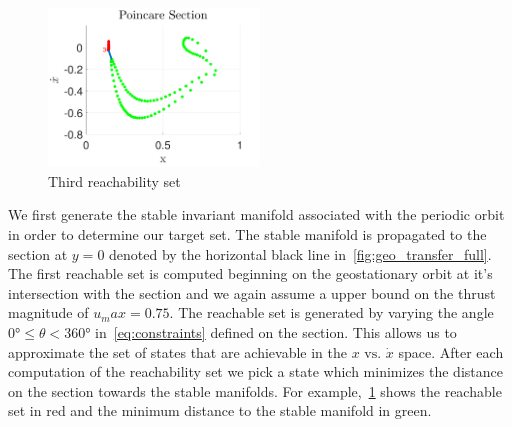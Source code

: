 \documentclass[preprint]{elsarticle}
\begin{document}
\begin{figure}[htbp]
   \centering
   \includegraphics[width=0.5\textwidth]{third_reachability_set} %
   \caption{Third reachability set}
   \label{fig:third_reachability_set}
\end{figure}
We first generate the stable invariant manifold associated with the periodic orbit in order to determine our target set.
The stable manifold is propagated to the \Poincare section at \( y = 0 \) denoted by the horizontal black line in~\cref{fig:geo_transfer_full}.
The first reachable set is computed beginning on the geostationary orbit at it's intersection with the \Poincare section and we again assume a upper bound on the thrust magnitude of \( u_max = 0.75 \).
The reachable set is generated by varying the angle \( \ang{0} \leq \theta < \ang{360} \) in~\cref{eq:constraints} defined on the \Poincare section.
This allows us to approximate the set of states that are achievable in the \( x \text{ vs. } \dot{x} \) space.
After each computation of the reachability set we pick a state which minimizes the distance on the \Poincare section towards the stable manifolds.
For example,~\cref{fig:third_reachability_set} shows the reachable set in red and the minimum distance to the stable manifold in green.
\end{document}
